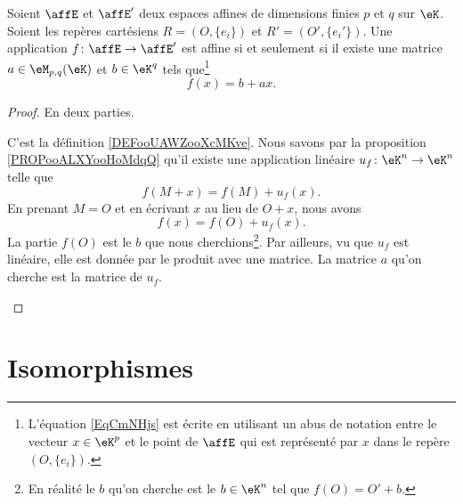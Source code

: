 \begin{theorem}     \label{THOooBAPDooEUtBgF}
	Soient \( \affE\) et \( \affE'\) deux espaces affines de dimensions finies \( p\) et \( q\) sur \( \eK\). Soient les repères cartésiens \( R=(O,\{ e_i \})\) et \( R'=(O',\{ e_i' \})\). Une application \( f\colon \affE\to \affE'\) est affine si et seulement si il existe une matrice \( a\in\eM_{p,q}(\eK)\) et \( b\in \eK^q\) tels que\footnote{L'équation \eqref{EqCmNHjs} est écrite en utilisant un abus de notation entre le vecteur \( x\in \eK^p\) et le point de \( \affE\) qui est représenté par \( x\) dans le repère \( (O,\{ e_i \})\).}
	\begin{equation}    \label{EqCmNHjs}
		f(x)=b+ax.
	\end{equation}
\end{theorem}

\begin{proof}
	En deux parties.
	\begin{subproof}
		\spitem[\( \Rightarrow\)]
		C'est la définition \ref{DEFooUAWZooXcMKve}.
		\spitem[\( \Leftarrow\)]
		Nous savons par la proposition \ref{PROPooALXYooHoMdqQ} qu'il existe une application linéaire \(u_f \colon \eK^n\to \eK^n  \) telle que
		\begin{equation}
			f(M+x)=f(M)+u_f(x).
		\end{equation}
		En prenant \( M=O\) et en écrivant \( x\) au lieu de \( O+x\), nous avons
		\begin{equation}
			f(x)=f(O)+u_f(x).
		\end{equation}
		La partie \( f(O)\) est le \( b\) que nous cherchions\footnote{En réalité le \( b\) qu'on cherche est le \( b\in \eK^n\) tel que \( f(O)=O'+b\).}. Par ailleurs, vu que \( u_f\) est linéaire, elle est donnée par le produit avec une matrice. La matrice \( a\) qu'on cherche est la matrice de \( u_f\).

	\end{subproof}
\end{proof}

\section{Isomorphismes}

